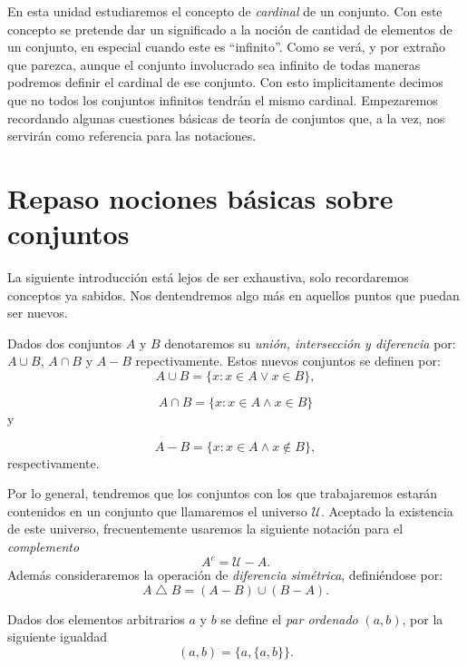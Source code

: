 En esta unidad estudiaremos el concepto de
\emph{cardinal} de un conjunto. Con este concepto se pretende dar
un significado a la noción de cantidad de elementos de un
conjunto, en especial cuando este es ``infinito''. Como se verá,
y por extraño que parezca, aunque el conjunto involucrado sea
infinito de todas maneras podremos definir el cardinal de ese
conjunto. Con esto implicitamente decimos que no todos los
conjuntos infinitos tendrán el mismo cardinal. Empezaremos
recordando algunas cuestiones básicas de teoría de
conjuntos que, a la vez, nos servirán como referencia para  las
notaciones.





\section{Repaso nociones básicas sobre  conjuntos}
La siguiente introducción está lejos de ser exhaustiva, solo
recordaremos conceptos ya sabidos. Nos dentendremos algo más en
aquellos puntos que puedan ser nuevos.

\begin{definicion}Dados dos conjuntos $A$ y $B$ denotaremos su \emph{unión,
intersección y diferencia} por: $A\cup B$, $A\cap B$ y $A-B$
repectivamente. Estos nuevos conjuntos se definen por: 
\[A\cup B=\{x:x\in A\vee x\in B\},\]

\[A\cap B=\{x:x\in A\wedge x\in B\}\]
y

\[A-B=\{x:x\in A \wedge x\notin B\},\]
respectivamente.
\end{definicion}
 Por lo general, tendremos que los
conjuntos con los que trabajaremos estarán contenidos en un
conjunto que llamaremos el universo $\mathcal{U}$. Aceptado la
existencia de este universo, frecuentemente usaremos la siguiente
notación para el \emph{complemento} 
\[A^c=\mathcal{U}-A.\] 
Además consideraremos la operación de \emph{diferencia simétrica},
definiéndose por:
\[A\bigtriangleup B=(A-B)\cup(B-A).\]
\begin{definicion}Dados dos elementos arbitrarios $a$ y $b$ se
define el \emph{par ordenado} $(a,b)$, por la siguiente igualdad
\[(a,b)=\{a,\{a,b\}\}.\]
\end{definicion}


